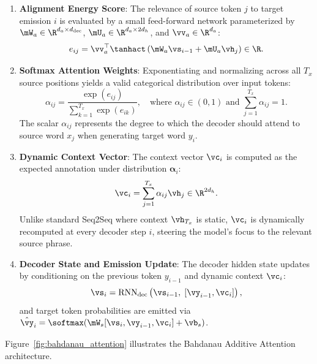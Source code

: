 \documentclass[../../main.tex]{subfiles}
\begin{document}
\begin{enumerate}
    \item \textbf{Alignment Energy Score}: The relevance of source token $j$ to target emission $i$ is evaluated by a small feed-forward network parameterized by $\mW_a \in \R^{d_a \times d_{\text{dec}}}$, $\mU_a \in \R^{d_a \times 2d_h}$, and $\vv_a \in \R^{d_a}$:
    \begin{equation}
    \label{eq:rnn_bahdanau_score}
    e_{ij} = \vv_a^\top \tanhact\left( \mW_a \vs_{i-1} + \mU_a \vh_j \right) \in \R.
    \end{equation}
    \item \textbf{Softmax Attention Weights}: Exponentiating and normalizing across all $T_x$ source positions yields a valid categorical distribution over input tokens:
    \begin{equation}
    \label{eq:rnn_bahdanau_weights}
    \alpha_{ij} = \frac{\exp(e_{ij})}{\sum_{k=1}^{T_x} \exp(e_{ik})}, \quad \text{where } \alpha_{ij} \in (0, 1) \text{ and } \sum_{j=1}^{T_x} \alpha_{ij} = 1.
    \end{equation}
    The scalar $\alpha_{ij}$ represents the degree to which the decoder should attend to source word $x_j$ when generating target word $y_i$.
    \item \textbf{Dynamic Context Vector}: The context vector $\vc_i$ is computed as the expected annotation under distribution $\boldsymbol{\alpha}_i$:
    \begin{equation}
    \label{eq:rnn_bahdanau_context}
    \vc_i = \sum_{j=1}^{T_x} \alpha_{ij} \vh_j \in \R^{2d_h}.
    \end{equation}
    Unlike standard Seq2Seq where context $\vh_{T_x}$ is static, $\vc_i$ is dynamically recomputed at every decoder step $i$, steering the model's focus to the relevant source phrase.
    \item \textbf{Decoder State and Emission Update}: The decoder hidden state updates by conditioning on the previous token $y_{i-1}$ and dynamic context $\vc_i$:
    \begin{equation}
    \label{eq:rnn_bahdanau_decoder_update}
    \vs_i = \operatorname{RNN}_{\text{dec}}\left( \vs_{i-1}, \; [\vy_{i-1}, \vc_i] \right),
    \end{equation}
    and target token probabilities are emitted via $\hat{\vy}_i = \softmax(\mW_s [\vs_i, \vy_{i-1}, \vc_i] + \vb_s)$.
\end{enumerate}

Figure~\ref{fig:bahdanau_attention} illustrates the Bahdanau Additive Attention architecture.
\end{document}
